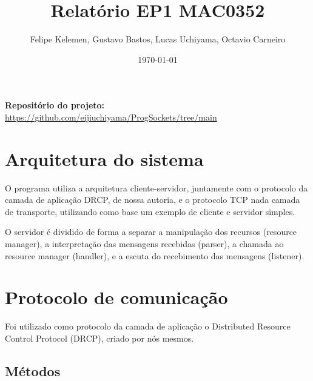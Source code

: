 \documentclass{article}
\title{Relatório EP1 MAC0352}
\author{Felipe Kelemen, Gustavo Bastos, Lucas Uchiyama, Octavio Carneiro}
\date{\today} %
\begin{document}
\maketitle %

\noindent\textbf{Repositório do projeto:} \url{https://github.com/eijiuchiyama/ProgSockets/tree/main}

\section{Arquitetura do sistema}

O programa utiliza a arquitetura cliente-servidor, juntamente com o protocolo da camada de aplicação DRCP, de nossa autoria, e o protocolo TCP nada camada de transporte, utilizando como base um exemplo de cliente e servidor simples.

O servidor é dividido de forma a separar a manipulação dos recursos (resource manager), a interpretação das mensagens  recebidas (parser), a chamada ao resource manager (handler), e a escuta do recebimento das mensagens (listener).

\section{Protocolo de comunicação}

Foi utilizado como protocolo da camada de aplicação o Distributed Resource Control Protocol (DRCP), criado por nós mesmos.

\subsection{Métodos}
\end{document}

